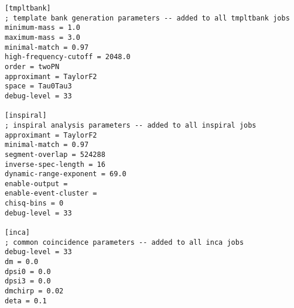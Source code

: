 \begin{verbatim}
[tmpltbank]
; template bank generation parameters -- added to all tmpltbank jobs
minimum-mass = 1.0 
maximum-mass = 3.0
minimal-match = 0.97
high-frequency-cutoff = 2048.0
order = twoPN
approximant = TaylorF2
space = Tau0Tau3
debug-level = 33

[inspiral]
; inspiral analysis parameters -- added to all inspiral jobs
approximant = TaylorF2
minimal-match = 0.97
segment-overlap = 524288
inverse-spec-length = 16
dynamic-range-exponent = 69.0
enable-output = 
enable-event-cluster = 
chisq-bins = 0
debug-level = 33

[inca]
; common coincidence parameters -- added to all inca jobs
debug-level = 33
dm = 0.0
dpsi0 = 0.0
dpsi3 = 0.0
dmchirp = 0.02
deta = 0.1
\end{verbatim}
